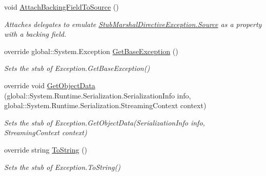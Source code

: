 \begin{DoxyCompactItemize}
void \hyperlink{class_system_1_1_runtime_1_1_interop_services_1_1_fakes_1_1_stub_marshal_directive_exception_aa564d2a8ed96e8e2850c7db3af2b530f}{Attach\-Backing\-Field\-To\-Source} ()
\begin{DoxyCompactList}\small\item\em Attaches delegates to emulate \hyperlink{class_system_1_1_runtime_1_1_interop_services_1_1_fakes_1_1_stub_marshal_directive_exception_a945cb6c94611a862a0fc8e7733acff55}{Stub\-Marshal\-Directive\-Exception.\-Source} as a property with a backing field.\end{DoxyCompactList}\item 
override global\-::\-System.\-Exception \hyperlink{class_system_1_1_runtime_1_1_interop_services_1_1_fakes_1_1_stub_marshal_directive_exception_ac512db5b88a94a90a26e9107a6cea6bf}{Get\-Base\-Exception} ()
\begin{DoxyCompactList}\small\item\em Sets the stub of Exception.\-Get\-Base\-Exception()\end{DoxyCompactList}\item 
override void \hyperlink{class_system_1_1_runtime_1_1_interop_services_1_1_fakes_1_1_stub_marshal_directive_exception_aa404bbf74c634386631012c980cd4cae}{Get\-Object\-Data} (global\-::\-System.\-Runtime.\-Serialization.\-Serialization\-Info info, global\-::\-System.\-Runtime.\-Serialization.\-Streaming\-Context context)
\begin{DoxyCompactList}\small\item\em Sets the stub of Exception.\-Get\-Object\-Data(\-Serialization\-Info info, Streaming\-Context context)\end{DoxyCompactList}\item 
override string \hyperlink{class_system_1_1_runtime_1_1_interop_services_1_1_fakes_1_1_stub_marshal_directive_exception_acb639f967b5a20cf60cc75a02c9ea782}{To\-String} ()
\begin{DoxyCompactList}\small\item\em Sets the stub of Exception.\-To\-String()\end{DoxyCompactList}\end{DoxyCompactItemize}
